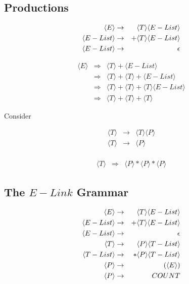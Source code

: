 \documentclass[a4paper,12pt]{article}
\begin{document}
\subsection*{Productions}

\begin{eqnarray}
\setcounter{equation}{1}
\langle E \rangle			& 	\to	& \langle T \rangle \langle E-List \rangle \\
\langle E-List \rangle	&	\to	& + \langle T \rangle \langle E-List \rangle \\
\langle E-List \rangle	&	\to	&	\epsilon 
\end{eqnarray}

\begin{eqnarray*}
\langle E \rangle	&	\Rightarrow	&	\langle T \rangle + \langle E-List \rangle \\
						&	\Rightarrow	&	\langle T \rangle + \langle T \rangle + \langle E-List \rangle \\
						&	\Rightarrow	&	\langle T \rangle + \langle T \rangle + \langle T \rangle \langle E-List \rangle \\ 
						&	\Rightarrow	&	\langle T \rangle + \langle T \rangle + \langle T \rangle 
\end{eqnarray*}

Consider

\begin{eqnarray}
\langle T \rangle	& 	\to	& \langle T \rangle \langle P \rangle \\
\langle T \rangle	&	\to	& \langle P \rangle \\
\end{eqnarray}

\begin{eqnarray*}
\langle T \rangle	&	\Rightarrow	&	\langle P \rangle \ast \langle P
\rangle \ast \langle P \rangle 
\end{eqnarray*}

\subsection*{The $E-Link$ Grammar}

\begin{eqnarray}
\setcounter{equation}{1}
\langle E \rangle			& 	\to	& \langle T \rangle \langle E-List \rangle \\
\langle E-List \rangle	&	\to	& + \langle T \rangle \langle E-List \rangle \\
\langle E-List \rangle	&	\to	& \epsilon \\
\langle T \rangle 		&	\to	& \langle P \rangle \langle T-List \rangle \\
\langle T-List \rangle	&	\to	& \ast \langle P \rangle \langle T-List \rangle \\
\langle P \rangle			&	\to	& \left( \langle E \rangle \right) \\
\langle P \rangle			&	\to	& COUNT
\end{eqnarray}
\end{document}
